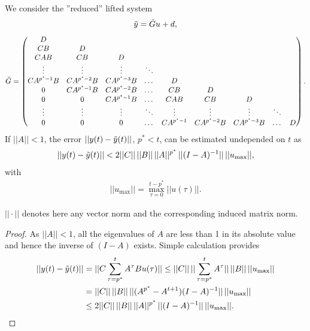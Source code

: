 	\begin{theo}
		\label{thm:Appl:redSys}
	We consider the ''reduced'' lifted system 
	\begin{align}
	\tilde{y} = \tilde{G} u + d, 
	\end{align}
	\begin{align}
	\tilde{G} = \begin{pmatrix}
	D  \\
	CB & D \\
	C A B & CB & D\\
	\vdots & \vdots & \vdots & \ddots \\
	C A^{p^\star-1} B & C A^{p^\star-2}B & C A^{p^\star-3}B &\dots& D \\
	0           & C A^{p^\star-1} B & C A^{p^\star-2} B & \dots & CB & D\\
	0 & 0 & C A^{p^\star-1} B & \dots & CAB & CB & D \\
	\vdots & \vdots & \vdots & \ddots & \vdots & \vdots & \vdots & \ddots \\
	0 & 0 & 0 & \dots & C A^{p^\star-1}& C A^{p^\star-2}B& CA^{p^\star-3}B &\dots & D
	\end{pmatrix}.
	\end{align}
	If $||A||<1$, the error $||y(t) - \tilde{y}(t)||$, $p^* < t$, can be estimated undepended on $t$ as 
	\begin{align}
	||y(t) - \tilde{y}(t)|| < 2 ||C|| \, ||B|| \,  ||A||^{p^*}\, ||(I - A)^{-1}||\,||u_{\max}||, 
	\end{align}
	with 
	\begin{align}
	||u_{\max}|| = \max_{\tau = 0}^{t - p^*} ||u(\tau)||. 
	\end{align}
	
	$||\cdot||$ denotes here any vector norm and the corresponding induced matrix norm. 

	\end{theo}	
	\begin{proof}
	As $||A||<1$, all the eigenvalues of $A$ are less than 1 in its absolute value and hence the inverse of $(I - A)$ exists. Simple calculation provides 
		\begin{align}
	\begin{split}
			||y(t) - \tilde{y}(t)|| &= ||C \sum_{\tau = p^*}^t A^\tau B u(\tau)|| \leq ||C|| \, ||\sum_{\tau = p^*}^t A^\tau || \,||B|| \, ||u_{\max}|| \\
			& = ||C|| \, ||B|| \, ||(A^{p^*} - A^{t + 1})(I - A)^{-1}|| \, ||u_{\max}|| \\
			&  \leq 2 ||C|| \, ||B|| \, ||A||^{p^*} \, ||(I - A)^{-1}|| \, ||u_{\max}||. 
	\end{split}
		\end{align}
	\end{proof}


